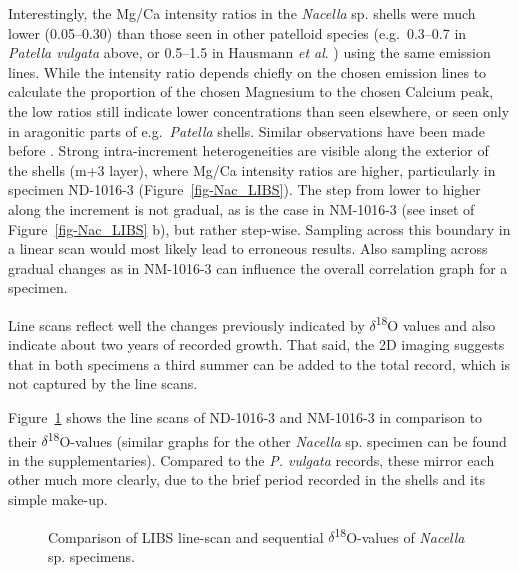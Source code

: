 \documentclass[
  authoryear,
  preprint,
  3p]{elsarticle}
\begin{document}
Interestingly, the Mg/Ca intensity ratios in the \emph{Nacella} sp.
shells were much lower (0.05--0.30) than those seen in other patelloid
species (e.g.~0.3--0.7 in \emph{Patella vulgata} above, or 0.5--1.5 in
Hausmann \emph{et al}. \citeyearpar{Hausmann2023-ih}) using the same
emission lines. While the intensity ratio depends chiefly on the chosen
emission lines to calculate the proportion of the chosen Magnesium to
the chosen Calcium peak, the low ratios still indicate lower
concentrations than seen elsewhere, or seen only in aragonitic parts of
e.g.~\emph{Patella} shells. Similar observations have been made before
\citep{Graniero2017-io}. Strong intra-increment heterogeneities are
visible along the exterior of the shells (m+3 layer), where Mg/Ca
intensity ratios are higher, particularly in specimen ND-1016-3
(Figure~\ref{fig-Nac_LIBS}). The step from lower to higher along the
increment is not gradual, as is the case in NM-1016-3 (see inset of
Figure~\ref{fig-Nac_LIBS} b), but rather step-wise. Sampling across this
boundary in a linear scan would most likely lead to erroneous results.
Also sampling across gradual changes as in NM-1016-3 can influence the
overall correlation graph for a specimen.

Line scans reflect well the changes previously indicated by
\(\delta\)\textsuperscript{18}O values and also indicate about two years
of recorded growth. That said, the 2D imaging suggests that in both
specimens a third summer can be added to the total record, which is not
captured by the line scans.

Figure~\ref{fig-Nac_Comp} shows the line scans of ND-1016-3 and
NM-1016-3 in comparison to their \(\delta\)\textsuperscript{18}O-values
(similar graphs for the other \emph{Nacella} sp. specimen can be found
in the supplementaries). Compared to the \emph{P. vulgata} records,
these mirror each other much more clearly, due to the brief period
recorded in the shells and its simple make-up.

\begin{figure}


\caption{\label{fig-Nac_Comp}Comparison of LIBS line-scan and sequential
\(\delta\)\textsuperscript{18}O-values of \emph{Nacella} sp. specimens.}

\end{figure}%
\end{document}
